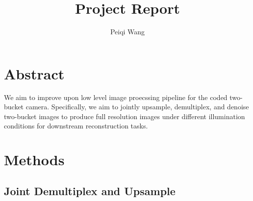 \documentclass[11pt]{article}
\title{Project Report}
\author{Peiqi Wang}
\begin{document}
\maketitle
\newpage 
\tableofcontents
\newpage


\section{Abstract}
We aim to improve upon low level image proecssing pipeline for the coded two-bucket camera. Specifically, we aim to jointly upsample, demultiplex, and denoise two-bucket images to produce full resolution images under different illumination conditions for downstream reconstruction tasks.





\section{Methods}


\subsection{Joint Demultiplex and Upsample}
\end{document}
